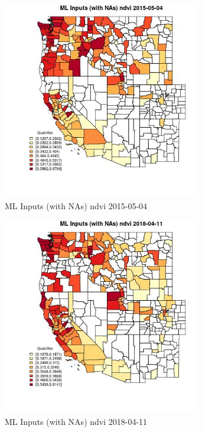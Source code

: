 \begin{figure} 
\centering  
\includegraphics[width=0.77\textwidth]{Code_Outputs/Report_ML_input_PM25_Step4_part_e_de_duplicated_aves_compiled_2019-05-18wNAs_CountyndviMean2015-05-04_2015-05-04.jpg} 
\caption{\label{fig:Report_ML_input_PM25_Step4_part_e_de_duplicated_aves_compiled_2019-05-18wNAsCountyndviMean2015-05-04_2015-05-04}ML Inputs (with NAs) ndvi 2015-05-04} 
\end{figure} 
 

\begin{figure} 
\centering  
\includegraphics[width=0.77\textwidth]{Code_Outputs/Report_ML_input_PM25_Step4_part_e_de_duplicated_aves_compiled_2019-05-18wNAs_CountyndviMean2018-04-11_2018-04-11.jpg} 
\caption{\label{fig:Report_ML_input_PM25_Step4_part_e_de_duplicated_aves_compiled_2019-05-18wNAsCountyndviMean2018-04-11_2018-04-11}ML Inputs (with NAs) ndvi 2018-04-11} 
\end{figure} 
 

